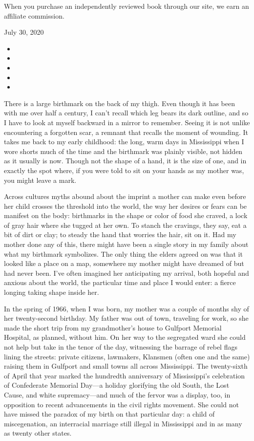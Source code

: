 When you purchase an independently reviewed book through our site, we
earn an affiliate commission.

July 30, 2020

\begin{itemize}
\item
\item
\item
\item
\item
\end{itemize}

There is a large birthmark on the back of my thigh. Even though it has
been with me over half a century, I can't recall which leg bears its
dark outline, and so I have to look at myself backward in a mirror to
remember. Seeing it is not unlike encountering a forgotten scar, a
remnant that recalls the moment of wounding. It takes me back to my
early childhood: the long, warm days in Mississippi when I wore shorts
much of the time and the birthmark was plainly visible, not hidden as it
usually is now. Though not the shape of a hand, it is the size of one,
and in exactly the spot where, if you were told to sit on your hands as
my mother was, you might leave a mark.

Across cultures myths abound about the imprint a mother can make even
before her child crosses the threshold into the world, the way her
desires or fears can be manifest on the body: birthmarks in the shape or
color of food she craved, a lock of gray hair where she tugged at her
own. To stanch the cravings, they say, eat a bit of dirt or clay; to
steady the hand that worries the hair, sit on it. Had my mother done any
of this, there might have been a single story in my family about what my
birthmark symbolizes. The only thing the elders agreed on was that it
looked like a place on a map, somewhere my mother might have dreamed of
but had never been. I've often imagined her anticipating my arrival,
both hopeful and anxious about the world, the particular time and place
I would enter: a fierce longing taking shape inside her.

In the spring of 1966, when I was born, my mother was a couple of months
shy of her twenty-second birthday. My father was out of town, traveling
for work, so she made the short trip from my grandmother's house to
Gulfport Memorial Hospital, as planned, without him. On her way to the
segregated ward she could not help but take in the tenor of the day,
witnessing the barrage of rebel flags lining the streets: private
citizens, lawmakers, Klansmen (often one and the same) raising them in
Gulfport and small towns all across Mississippi. The twenty-sixth of
April that year marked the hundredth anniversary of Mississippi's
celebration of Confederate Memorial Day---a holiday glorifying the old
South, the Lost Cause, and white supremacy---and much of the fervor was
a display, too, in opposition to recent advancements in the civil rights
movement. She could not have missed the paradox of my birth on that
particular day: a child of miscegenation, an interracial marriage still
illegal in Mississippi and in as many as twenty other states.


